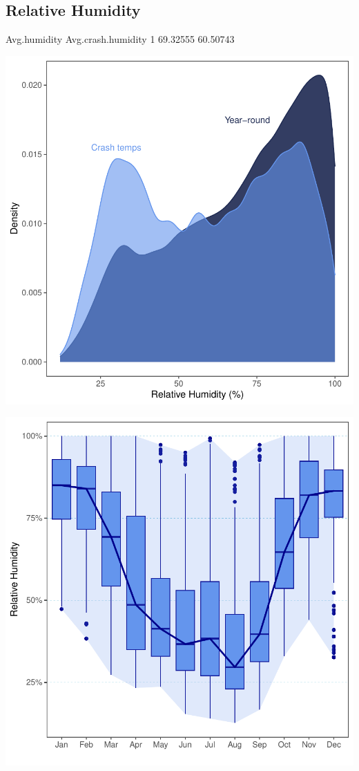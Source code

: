 \documentclass[11pt, a4paper]{article}
\begin{document}
\pagebreak
\subsection{Relative Humidity}

\begin{Schunk}
\begin{Soutput}
  Avg.humidity Avg.crash.humidity
1     69.32555           60.50743
\end{Soutput}
\end{Schunk}
\includegraphics{variableinvestigation-010}

\includegraphics{variableinvestigation-011}
\end{document}

